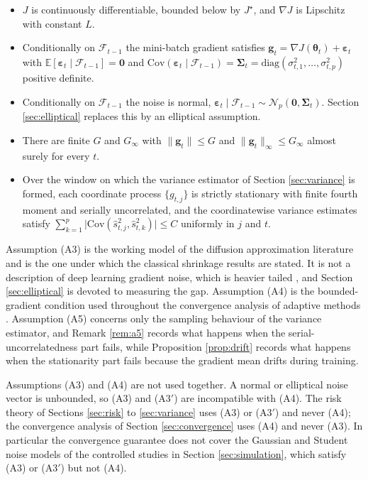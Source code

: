 \documentclass[pdflatex,sn-mathphys-num]{sn-jnl}%
\theoremstyle{thmstyleone}%
\theoremstyle{thmstyletwo}%
\theoremstyle{thmstylethree}%
\newcommand{\rev}[1]{{\color{blue}#1}}
\newenvironment{revblock}{\color{blue}}{}
\newcommand{\Cov}{\mathrm{Cov}}
\newcommand{\diag}{\mathrm{diag}}
\newcommand{\E}{\mathbb{E}}
\begin{document}
\begin{itemize}
\item[(A1)] $J$ is continuously differentiable, bounded below by $J^\star$, and $\nabla J$ is Lipschitz with constant $L$.
\item[(A2)] Conditionally on $\mathcal F_{t-1}$ the mini-batch gradient satisfies $\bm g_t=\nabla J(\bm\theta_t)+\bm\varepsilon_t$ with $\E[\bm\varepsilon_t\mid\mathcal F_{t-1}]=\bm 0$ and $\Cov(\bm\varepsilon_t\mid\mathcal F_{t-1})=\bm\Sigma_t=\diag(\sigma^2_{t,1},\dots,\sigma^2_{t,p})$ positive definite.
\item[(A3)] Conditionally on $\mathcal F_{t-1}$ the noise is normal, $\bm\varepsilon_t\mid\mathcal F_{t-1}\sim\mathcal N_p(\bm 0,\bm\Sigma_t)$. Section \ref{sec:elliptical} replaces this by an elliptical assumption.
\item[(A4)] There are finite $G$ and $G_\infty$ with $\|\bm g_t\|\le G$ and $\|\bm g_t\|_\infty\le G_\infty$ almost surely for every $t$.
\item[(A5)] Over the window on which the variance estimator of Section \ref{sec:variance} is formed, each coordinate process $\{g_{t,j}\}$ is strictly stationary with finite fourth moment and serially uncorrelated, and the coordinatewise variance estimates satisfy $\sum_{k=1}^{p}\bigl|\Cov(\hat s^2_{t,j},\hat s^2_{t,k})\bigr|\le C$ uniformly in $j$ and $t$.
\end{itemize}

Assumption (A3) is the working model of the diffusion approximation literature \cite{mandt2017} and is the one under which the classical shrinkage results are stated. It is not a description of deep learning gradient noise, which is heavier tailed \cite{simsekli2019, gurbuzbalaban2021}, and Section \ref{sec:elliptical} is devoted to measuring the gap. Assumption (A4) is the bounded-gradient condition used throughout the convergence analysis of adaptive methods \cite{reddi2018, chen2019, defossez2022}. Assumption (A5) concerns only the sampling behaviour of the variance estimator, and Remark \ref{rem:a5} records what happens when the serial-uncorrelatedness part fails\rev{, while Proposition \ref{prop:drift} records what happens when the stationarity part fails because the gradient mean drifts during training.}

\begin{revblock}
Assumptions (A3) and (A4) are not used together. A normal or elliptical noise vector is unbounded, so (A3) and (A3$'$) are incompatible with (A4). The risk theory of Sections \ref{sec:risk} to \ref{sec:variance} uses (A3) or (A3$'$) and never (A4); the convergence analysis of Section \ref{sec:convergence} uses (A4) and never (A3). In particular the convergence guarantee does not cover the Gaussian and Student noise models of the controlled studies in Section \ref{sec:simulation}, which satisfy (A3) or (A3$'$) but not (A4).
\end{revblock}
\end{document}
